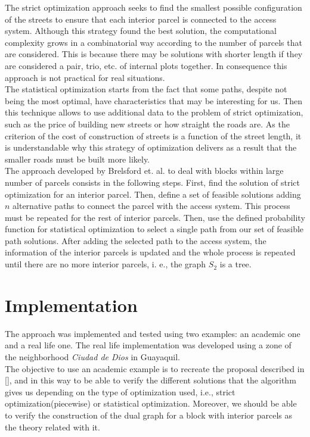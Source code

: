 \documentclass[10pt]{article}
\begin{document}
The strict optimization approach seeks to find the smallest possible configuration of the streets to ensure that each interior parcel is connected to the access system. Although this strategy found the best solution, the computational complexity grows in a combinatorial way according to the number of parcels that are considered. This is because there may be solutions with shorter length if they are considered a pair, trio, etc. of internal plots together. In consequence this approach is not practical for real situations.\\

The statistical optimization starts from the fact that some paths, despite not being the most optimal, have characteristics that may be interesting for us. Then this technique allows to use additional data to the problem of strict optimization, such as the price of building new streets or how straight the roads are. As the criterion of the cost of construction of streets is a function of the street length, it is understandable why this strategy of optimization delivers as a result that the smaller roads must be built more likely.\\

The approach developed by Brelsford et. al. to deal with blocks within large number of parcels consists in the following steps. First, find the solution of strict optimization for an interior parcel. Then, define a set of feasible solutions adding $n$ alternative paths to connect the parcel with the access system. This process must be repeated for the rest of interior parcels. Then, use the defined probability function for statistical optimization to select a single path from our set of feasible path solutions. After adding the selected path to the access system, the information of the interior parcels is updated and the whole process is repeated until there are no more interior parcels, i. e., the graph $ S_2 $ is a tree.

\section{Implementation}
The approach was implemented and tested using two examples: an academic one and a real life one. The real life implementation was developed using a zone of the neighborhood \emph{Ciudad de Dios} in Guayaquil.\\

The objective to use an academic example is to recreate the proposal described in [], and in this way to be able to verify the different solutions that the algorithm gives us depending on the type of optimization used, i.e., strict optimization(piecewise) or statistical optimization. Moreover, we should be able to verify the construction of the dual graph for a block with interior parcels as the theory related with it.\\
\end{document}
